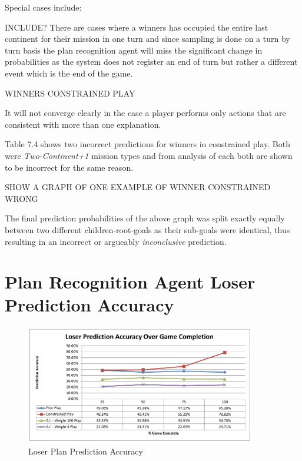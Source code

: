 \documentclass[parskip]{cs4rep}
\begin{document}
Special cases include:

INCLUDE? There are cases where a winners has occupied the entire last continent for their mission in one turn and since sampling is done on a turn by turn basis the plan recognition agent will miss the significant change in probabilities as the system does not register an end of turn but rather a different event which is the end of the game.

WINNERS CONSTRAINED PLAY

It will not converge clearly in the case a player performs only actions that are consistent with more than one explanation.

Table 7.4 shows two incorrect predictions for winners in constrained play. Both were \textit{Two-Continent+1} mission types and from analysis of each both are shown to be incorrect for the same reason. 

SHOW A GRAPH OF ONE EXAMPLE OF WINNER CONSTRAINED WRONG

The final prediction probabilities of the above graph was split exactly equally between two different children-root-goals as their sub-goals were identical, thus resulting in an incorrect or argueably \textit{inconclusive} prediction.

\newpage

\section{Plan Recognition Agent Loser Prediction Accuracy}

\begin{figure}[h]
\centerline{
\includegraphics[width=0.9\textwidth]{images/loser-game-complete.pdf}
}
\caption{Loser Plan Prediction Accuracy}
\label{fig:dom-debug-gui}
\end{figure} 
\end{document}

